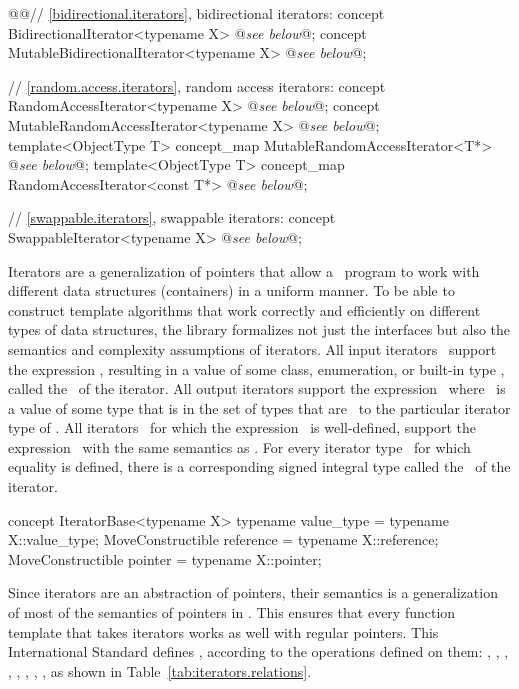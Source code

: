 \documentclass[american,twoside]{book}
\begin{document}
\begin{paras}
\begin{codeblock}
{  @\textcolor{addclr}{}@// \ref{bidirectional.iterators}, bidirectional iterators:
  concept BidirectionalIterator<typename X> @\textit{see below}@;
  concept MutableBidirectionalIterator<typename X> @\textit{see below}@;

  // \ref{random.access.iterators}, random access iterators:
  concept RandomAccessIterator<typename X> @\textit{see below}@;
  concept MutableRandomAccessIterator<typename X> @\textit{see below}@;
  template<ObjectType T> concept_map MutableRandomAccessIterator<T*> @\textit{see below}@;
  template<ObjectType T> concept_map RandomAccessIterator<const T*> @\textit{see below}@;

  // \ref{swappable.iterators}, swappable iterators:
  concept SwappableIterator<typename X> @\textit{see below}@;
}
\end{codeblock}
\color{black}

\pnum
{}%
Iterators are a generalization of pointers that allow a \Cpp\ program to work with different data structures
(containers) in a uniform manner.
To be able to construct template algorithms that work correctly and
efficiently on different types of data structures, the library formalizes not just the interfaces but also the
semantics and complexity assumptions of iterators.
All input iterators
\
support the expression
,
resulting in a value of some class, enumeration, or built-in type
\tcode{T},
called the
\ 
of the iterator.
All output iterators support the expression
\
where
\tcode{o}\
is a value of some type that is in the set of types that are
\
to the particular iterator type of
.
All iterators
\tcode{i}\
for which the expression
\
is well-defined, support the expression
\tcode{i->m}\
with the same semantics as
\tcode{(*i).m}.
For every iterator type
\tcode{X}\
for which
equality is defined, there is a corresponding signed integral type called the
\ 
of the iterator.

\color{addclr}
\begin{itemdecl}
concept IteratorBase<typename X> {
  typename value_type         = typename X::value_type;
  MoveConstructible reference = typename X::reference;
  MoveConstructible pointer   = typename X::pointer;
}
\end{itemdecl}
\color{black}

\pnum
Since iterators are an abstraction of pointers, their semantics is
a generalization of most of the semantics of pointers in \Cpp.
This ensures that every
function template
that takes iterators
works as well with regular pointers.
This International Standard defines
, according to the operations
defined on them:
,
\techterm{output iterators},
\techterm{forward iterators}, ,
, ,
, 
,
as shown in Table~\ref{tab:iterators.relations}.


\end{paras}
\end{document}
